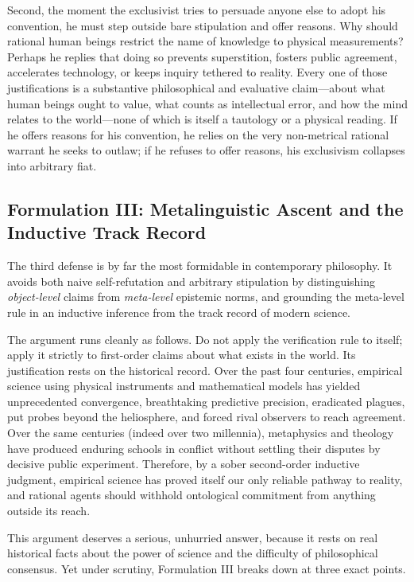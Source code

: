 Second, the moment the exclusivist tries to persuade anyone else to adopt his convention, he must step outside bare stipulation and offer reasons. Why should rational human beings restrict the name of knowledge to physical measurements? Perhaps he replies that doing so prevents superstition, fosters public agreement, accelerates technology, or keeps inquiry tethered to reality. Every one of those justifications is a substantive philosophical and evaluative claim---about what human beings ought to value, what counts as intellectual error, and how the mind relates to the world---none of which is itself a tautology or a physical reading. If he offers reasons for his convention, he relies on the very non-metrical rational warrant he seeks to outlaw; if he refuses to offer reasons, his exclusivism collapses into arbitrary fiat.

\subsection{Formulation III: Metalinguistic Ascent and the Inductive Track Record}

The third defense is by far the most formidable in contemporary philosophy. It avoids both naive self-refutation and arbitrary stipulation by distinguishing \emph{object-level} claims from \emph{meta-level} epistemic norms, and grounding the meta-level rule in an inductive inference from the track record of modern science.

The argument runs cleanly as follows. Do not apply the verification rule to itself; apply it strictly to first-order claims about what exists in the world. Its justification rests on the historical record. Over the past four centuries, empirical science using physical instruments and mathematical models has yielded unprecedented convergence, breathtaking predictive precision, eradicated plagues, put probes beyond the heliosphere, and forced rival observers to reach agreement. Over the same centuries (indeed over two millennia), metaphysics and theology have produced enduring schools in conflict without settling their disputes by decisive public experiment. Therefore, by a sober second-order inductive judgment, empirical science has proved itself our only reliable pathway to reality, and rational agents should withhold ontological commitment from anything outside its reach.

This argument deserves a serious, unhurried answer, because it rests on real historical facts about the power of science and the difficulty of philosophical consensus. Yet under scrutiny, Formulation III breaks down at three exact points.


